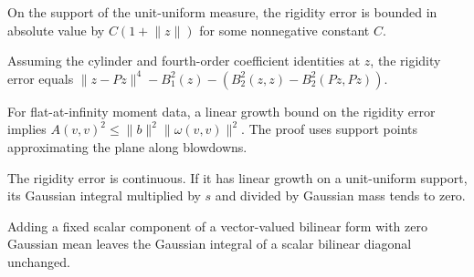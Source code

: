 \begin{lemma}
\label{lem:rigidity-error-linear-growth}

On the support of the unit-uniform measure, the rigidity error is bounded in absolute value by $C(1+\lVert z\rVert)$ for some nonnegative constant $C$.
\end{lemma}

\begin{lemma}
\label{lem:rigidity-error-remainder}

Assuming the cylinder and fourth-order coefficient identities at $z$, the rigidity error equals $\lVert z-Pz\rVert^4-B_1^2(z)-(B_2^2(z,z)-B_2^2(Pz,Pz))$.
\end{lemma}

\begin{lemma}
\label{lem:rigidity-pointwise-from-growth}

For flat-at-infinity moment data, a linear growth bound on the rigidity error implies $A(v,v)^2\le\lVert b\rVert^2\lVert\omega(v,v)\rVert^2$. The proof uses support points approximating the plane along blowdowns.
\end{lemma}

\begin{lemma}
\label{lem:rigidity-error-limit-from-growth}

The rigidity error is continuous. If it has linear growth on a unit-uniform support, its Gaussian integral multiplied by $s$ and divided by Gaussian mass tends to zero.
\end{lemma}

\begin{lemma}
\label{lem:gaussian-mean-zero-correction}

Adding a fixed scalar component of a vector-valued bilinear form with zero Gaussian mean leaves the Gaussian integral of a scalar bilinear diagonal unchanged.
\end{lemma}


